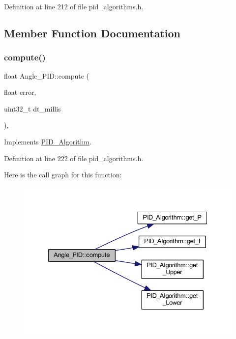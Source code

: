 Definition at line 212 of file pid\+\_\+algorithms.\+h.



\subsection{Member Function Documentation}
\mbox{\label{class_angle___p_i_d_a3816cd7799d40587898c0a3def37ae5e}} 
\subsubsection{\texorpdfstring{compute()}{compute()}}
{\footnotesize\ttfamily float Angle\+\_\+\+P\+I\+D\+::compute (\begin{DoxyParamCaption}\item[{float}]{error,  }\item[{uint32\+\_\+t}]{dt\+\_\+millis }\end{DoxyParamCaption})\hspace{0.3cm}{\ttfamily [inline]}, {\ttfamily [virtual]}}



Implements \mbox{\hyperlink{class_p_i_d___algorithm_a388ec97d23c981e62c3726505688e1f0}{P\+I\+D\+\_\+\+Algorithm}}.



Definition at line 222 of file pid\+\_\+algorithms.\+h.

Here is the call graph for this function\+:
\nopagebreak
\begin{figure}[H]
\begin{center}
\leavevmode
\includegraphics[width=332pt]{class_angle___p_i_d_a3816cd7799d40587898c0a3def37ae5e_cgraph}
\end{center}
\end{figure}
\mbox{\label{class_angle___p_i_d_a5cfa125406d0dd0504ccea19afec486c}} 
